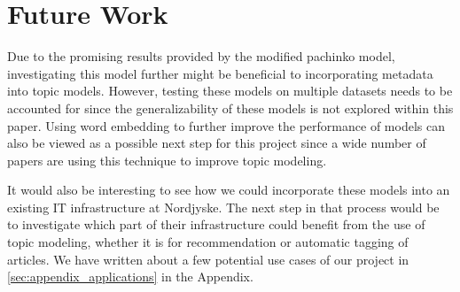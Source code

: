 \section{Future Work}\label{sec:future_work}
Due to the promising results provided by the modified pachinko model, investigating this model further might be beneficial to incorporating metadata into topic models.
However, testing these models on multiple datasets needs to be accounted for since the generalizability of these models is not explored within this paper.
Using word embedding to further improve the performance of models can also be viewed as a possible next step for this project since a wide number of papers are using this technique to improve topic modeling.


It would also be interesting to see how we could incorporate these models into an existing IT infrastructure at Nordjyske.
The next step in that process would be to investigate which part of their infrastructure could benefit from the use of topic modeling, whether it is for recommendation or automatic tagging of articles. 
We have written about a few potential use cases of our project in \ref{sec:appendix_applications} in the Appendix. 
